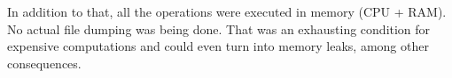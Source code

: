 In addition to that, all the operations were executed in memory (CPU + RAM). No actual file dumping was being done. That was an exhausting condition for expensive computations and could even turn into memory leaks, among other consequences.

